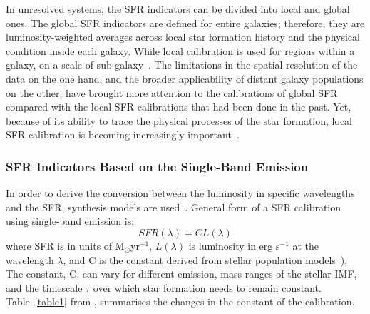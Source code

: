 In unresolved systems, the SFR indicators can be divided into local and global ones. 
The global SFR indicators are defined for entire galaxies; therefore, they are luminosity-weighted averages across local star formation history and the physical condition inside each galaxy. 
While local calibration is used for regions within a galaxy, on a scale of sub-galaxy~\citep[e.g.,][]{Zhu08, Kennicutt09, Boquien10, Boquien11, Hao11}.
The limitations in the spatial resolution of the data on the one hand, and the broader applicability of distant galaxy populations on the other, have brought more attention to the calibrations of global SFR compared with the local SFR calibrations that had been done in the past. 
Yet, because of its ability to trace the physical processes of the star formation, local SFR calibration is becoming increasingly important~\citep{Calzetti13}.

\subsubsection*{SFR Indicators Based on the Single-Band Emission}

In order to derive the conversion between the luminosity in specific wavelengths and the SFR, synthesis models are used~\citep{Kennicutt98b}. 
General form of a SFR calibration using single-band emission is: 
\begin{equation}
\label{equ: sfrsingle}
SFR(\lambda)= CL(\lambda)
\end{equation}
where SFR is in units of M${_\odot}$yr$^{-1}$, $L(\lambda)$ is luminosity in erg s$^{-1}$ at the wavelength $\lambda$, and C is the constant derived from stellar population models~\citep[e.g, starburst99][]{Leitherer99}). 
The constant, C, can vary for different emission, mass ranges of the stellar IMF, and the timescale $\tau$ over which star formation needs to remain constant. 
Table~\ref{table1} from \cite{Calzetti13}, summarises the changes in the constant of the calibration. 

